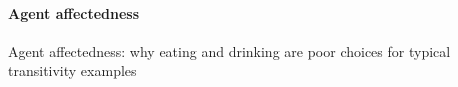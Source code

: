 
\paragraph{Agent affectedness} 
Agent affectedness: why eating and drinking are poor choices for typical transitivity examples



